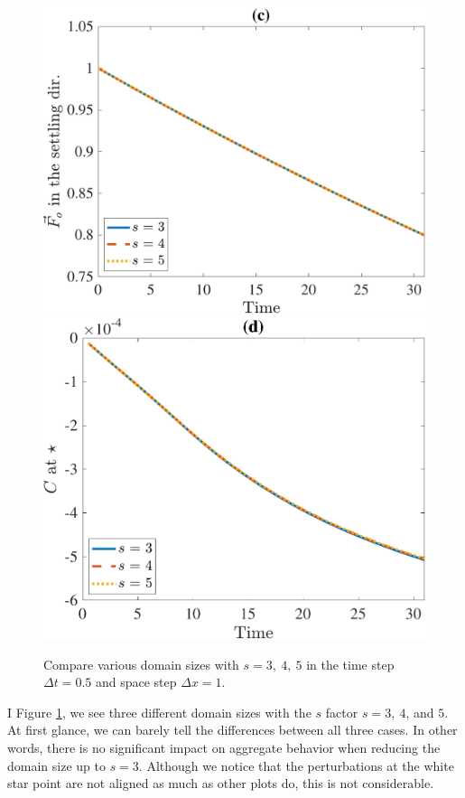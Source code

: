 \begin{figure}[ht]
\begin{center}
		\includegraphics[scale=0.2]{./figures/fig_NC10_s_Fo3_all}
		\includegraphics[scale=0.2]{./figures/fig_NC10_s_C_star}
	\caption{Compare various domain sizes with $ s = 3, \ 4, \ 5$ in the time step  $\Delta t = 0.5$ and space step $\Delta x = 1$.}
	\label{fig_NC10_compare_s}
\end{center}
\end{figure}
\par
I Figure \ref{fig_NC10_compare_s}, we see three different domain sizes with the $s$ factor $s = 3, \ 4$, and $5$. At first glance, we can barely tell the differences between all three cases. In other words, there is no significant impact on aggregate behavior when reducing the domain size up to $s = 3$. Although we notice that the perturbations at the white star point are not aligned as much as other plots do, this is not considerable. 

